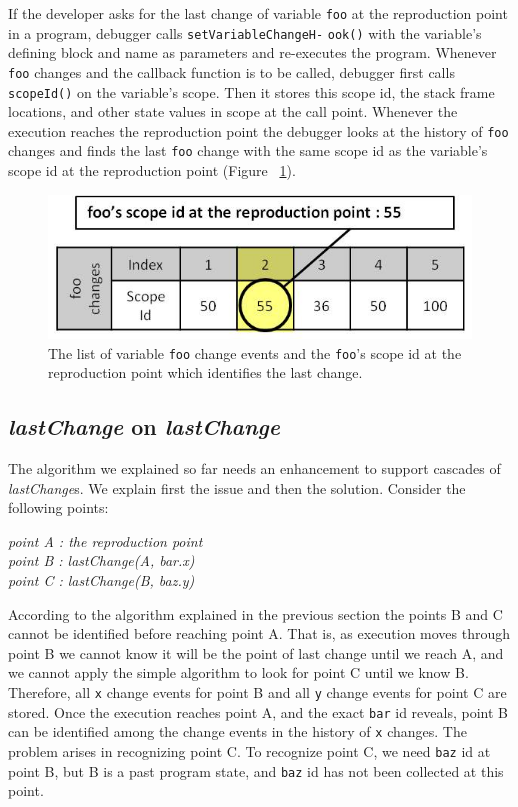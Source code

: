\documentclass[preprint]{sigplanconf}
\begin{document}
If the developer asks for the last change of variable \texttt{foo} at the 
reproduction point in a program, debugger calls 
\texttt{setVariableChangeH-} \texttt{ook()} with the variable's defining
block and name as parameters and re-executes the
program. Whenever \texttt{foo} changes and the callback function is to
be called, debugger first calls \texttt{scopeId()} on the
variable's scope. Then it stores this scope id, the stack
frame locations, and other state values in scope at the call point.
Whenever the execution reaches the reproduction point the debugger
looks at the history of \texttt{foo} changes and finds the last
\texttt{foo} change with the same scope id as the variable's scope id
at the reproduction point (Figure ~\ref{fig:foo-changes2}). 


\begin{figure}[htp]
\includegraphics[width=.48\textwidth]{7-foo-changes2.jpg}
\caption{The list of variable \texttt{foo} change events and the
  \texttt{foo}'s scope id at the reproduction point which identifies
  the last change.}
\label{fig:foo-changes2}
\end{figure}

 
\subsection{\textit{lastChange} on \textit{lastChange}}
The algorithm we explained so far needs an enhancement to support
cascades of \textit{lastChange}s. We explain first the issue
and then the solution. Consider the following points:

\begin{center}
\textit{
 point A : the reproduction point \\
 point B : lastChange(A, bar.x) \\
 point C : lastChange(B, baz.y) 
 }
 \end{center}
According to the algorithm explained in the previous section
the points B and C cannot be identified before reaching point
A. That is, as execution moves through point B we cannot know it will be the point of last change until
we reach A, and we cannot apply the simple algorithm to look for point C until we know B. 
 Therefore, all \texttt{x} change events for point B and all \texttt{y}
change events for point C are stored. Once the execution reaches point A,
and the exact \texttt{bar} id reveals, point B can be identified among
the change events in the history of \texttt{x} changes. The problem
arises in recognizing point C. To recognize point C, we need
\texttt{baz} id at point B, but B is a past program state, and
\texttt{baz} id has not been collected at this point.
\end{document}
